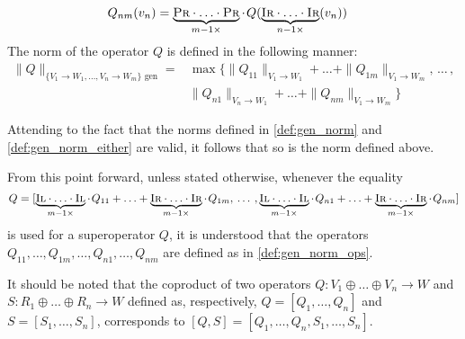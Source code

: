 \begin{definition}
\begin{equation*}
\begin{split}
      & Q_{nm} (v_n) =  \underbrace{\textsc{Pr} \cdot \ldots \cdot \textsc{Pr}}_{m-1 \times } \cdot \hspace{1pt} Q (\underbrace{\textsc{Ir} \cdot \ldots \cdot \textsc{Ir}}_{n-1 \times}(v_n))
    \end{split}
  \end{equation*}
  The norm of the operator $Q$ is defined in the following manner:
  \begin{equation}
    \begin{split}
    \|Q\|_{\{V_1\rightarrow W_1, \ldots, V_n\rightarrow W_m\} \text{ gen}} = & \max \{\|Q_{11}\|_{V_1 \rightarrow W_1} + \ldots + \|Q_{1m}\|_{V_1 \rightarrow W_m}, \hspace{2pt} \ldots  \hspace{2pt}, \\ 
    & \|Q_{n1}\|_{V_n \rightarrow W_1} + \ldots + \|Q_{nm}\|_{V_1 \rightarrow W_m}  \}
    \end{split}
  \end{equation}
\end{definition}
Attending to the fact that the norms defined in \autoref{def:gen_norm} and \autoref{def:gen_norm_either} are valid, it follows that so is the norm defined above.

\begin{convention}
  From this point forward, unless stated otherwise, whenever the equality 
  $$Q= [ \underbrace{\textsc{Il} \cdot \ldots \cdot \textsc{Il}}_{m-1 \times} \cdot \hspace{1pt} Q_{11} + \ldots +   \underbrace{\textsc{Ir} \cdot \ldots \cdot \textsc{Ir}}_{m-1 \times}\cdot \hspace{1pt} Q_{1m},  \hspace{2pt} \ldots  \hspace{2pt},  \underbrace{\textsc{Il} \cdot \ldots \cdot \textsc{Il}}_{m-1 \times} \cdot\hspace{1pt} Q_{n1} + \ldots + \underbrace{\textsc{Ir} \cdot \ldots \cdot \textsc{Ir}}_{m-1 \times}\cdot \hspace{1pt} Q_{nm}]$$
   is used for a superoperator $Q$, it is understood that the operators $Q_{11}, \ldots, Q_{1m}, \ldots, Q_{n1}, \ldots, Q_{nm}$ are defined as in \autoref{def:gen_norm_ops}.
\end{convention}

It should be noted that the coproduct of two operators $Q: V_1 \oplus \ldots \oplus V_n \rightarrow W$ and $S: R_1 \oplus \ldots \oplus R_n \rightarrow W$ defined as, respectively, $Q = [Q_1, \ldots, Q_n]$ and $S = [S_1, \ldots, S_n]$, corresponds to $[Q,S] = [Q_1, \ldots, Q_n, S_1, \ldots, S_n]$.

